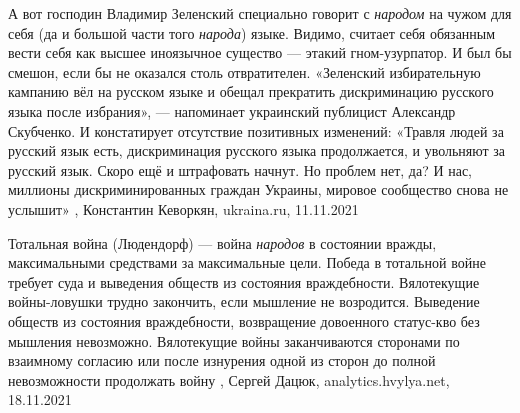 А вот господин Владимир Зеленский специально говорит с \emph{народом} на чужом
для себя (да и большой части того \emph{народа}) языке. Видимо, считает себя
обязанным вести себя как высшее иноязычное существо — этакий гном-узурпатор. И
был бы смешон, если бы не оказался столь отвратителен.  «Зеленский
избирательную кампанию вёл на русском языке и обещал прекратить дискриминацию
русского языка после избрания», — напоминает украинский публицист Александр
Скубченко. И констатирует отсутствие позитивных изменений: «Травля людей за
русский язык есть, дискриминация русского языка продолжается, и увольняют за
русский язык. Скоро ещё и штрафовать начнут. Но проблем нет, да? И нас,
миллионы дискриминированных граждан Украины, мировое сообщество снова не
услышит»
, 
Константин Кеворкян, ukraina.ru, 11.11.2021

Тотальная война (Людендорф) — война \emph{народов} в состоянии вражды,
максимальными средствами за максимальные цели. Победа в тотальной войне требует
суда и выведения обществ из состояния враждебности.  Вялотекущие войны-ловушки
трудно закончить, если мышление не возродится.  Выведение обществ из состояния
враждебности, возвращение довоенного статус-кво без мышления невозможно.
Вялотекущие войны заканчиваются сторонами по взаимному согласию или после
изнурения одной из сторон до полной невозможности продолжать войну
, Сергей Дацюк, analytics.hvylya.net, 18.11.2021
